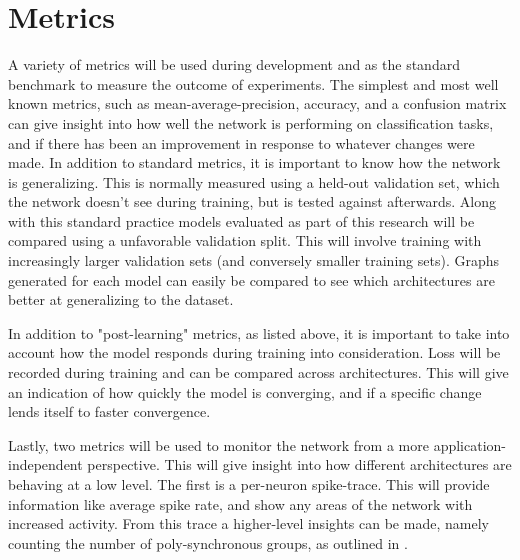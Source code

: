     \section{Metrics} \label{section:metrics}
    A variety of metrics will be used during development and as the standard
    benchmark to measure the outcome of experiments. The simplest and most well
    known metrics, such as mean-average-precision, accuracy, and a confusion
    matrix can give insight into how well the network is performing on
    classification tasks, and if there has been an improvement in response to
    whatever changes were made. In addition to standard metrics, it is important
    to know how the network is generalizing. This is normally measured using a
    held-out validation set, which the network doesn't see during training, but
    is tested against afterwards. Along with this standard practice models
    evaluated as part of this research will be compared using a unfavorable
    validation split. This will involve training with increasingly larger
    validation sets (and conversely smaller training sets). Graphs generated for
    each model can easily be compared to see which architectures are better at
    generalizing to the dataset.
    
    In addition to "post-learning" metrics, as listed above, it is important to
    take into account how the model responds during training into
    consideration. Loss will be recorded during training and can be compared
    across architectures. This will give an indication of how quickly the model
    is converging, and if a specific change lends itself to faster convergence.
    
    Lastly, two metrics will be used to monitor the network from a more
    application-independent perspective. This will give insight into how
    different architectures are behaving at a low level. The first is a
    per-neuron spike-trace. This will provide information like average spike
    rate, and show any areas of the network with increased activity. From this
    trace a higher-level insights can be made, namely counting the number of
    poly-synchronous groups, as outlined in \cite{sgnn_transistor}.
    
